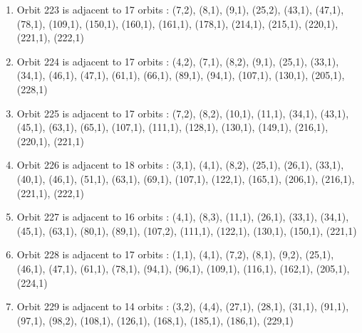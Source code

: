 \documentclass[12pt]{article}
\begin{document}
\begin{enumerate}
\item Orbit 223 is adjacent to 17 orbits : (7,2), (8,1), (9,1), (25,2), (43,1), (47,1), (78,1), (109,1), (150,1), (160,1), (161,1), (178,1), (214,1), (215,1), (220,1), (221,1), (222,1)
\item Orbit 224 is adjacent to 17 orbits : (4,2), (7,1), (8,2), (9,1), (25,1), (33,1), (34,1), (46,1), (47,1), (61,1), (66,1), (89,1), (94,1), (107,1), (130,1), (205,1), (228,1)
\item Orbit 225 is adjacent to 17 orbits : (7,2), (8,2), (10,1), (11,1), (34,1), (43,1), (45,1), (63,1), (65,1), (107,1), (111,1), (128,1), (130,1), (149,1), (216,1), (220,1), (221,1)
\item Orbit 226 is adjacent to 18 orbits : (3,1), (4,1), (8,2), (25,1), (26,1), (33,1), (40,1), (46,1), (51,1), (63,1), (69,1), (107,1), (122,1), (165,1), (206,1), (216,1), (221,1), (222,1)
\item Orbit 227 is adjacent to 16 orbits : (4,1), (8,3), (11,1), (26,1), (33,1), (34,1), (45,1), (63,1), (80,1), (89,1), (107,2), (111,1), (122,1), (130,1), (150,1), (221,1)
\item Orbit 228 is adjacent to 17 orbits : (1,1), (4,1), (7,2), (8,1), (9,2), (25,1), (46,1), (47,1), (61,1), (78,1), (94,1), (96,1), (109,1), (116,1), (162,1), (205,1), (224,1)
\item Orbit 229 is adjacent to 14 orbits : (3,2), (4,4), (27,1), (28,1), (31,1), (91,1), (97,1), (98,2), (108,1), (126,1), (168,1), (185,1), (186,1), (229,1)
\end{enumerate}
\end{document}
